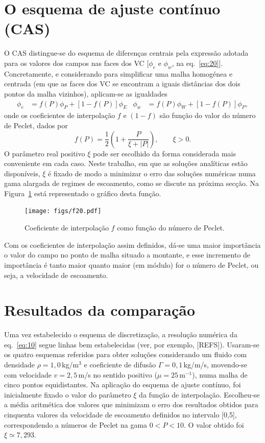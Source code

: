 \documentclass[11pt,twoside]{article}
\begin{document}
{\section{O esquema de ajuste contínuo (CAS)}
O CAS distingue-se do esquema de diferenças centrais pela expressão adotada para
os valores dos campos nas faces dos VC [$\phi_e$ e $\phi_w$, na
eq.~\eqref{eq:20}]. Concretamente, e considerando para simplificar uma malha
homogénea e centrada (em que as faces dos VC se encontram a iguais distâncias
dos dois pontos da malha vizinhos), aplicam-se as igualdades
\begin{align}
    \phi_e &= f(P)\phi_P + [1-f(P)]\phi_E&
    \phi_w &= f(P)\phi_W + [1-f(P)]\phi_P,
\end{align}
onde os coeficientes de interpolação $f$ e $(1-f)$ são função do valor do número
de Peclet, dados por
\begin{equation}
    f(P)=\frac12\left(1+\frac{P}{\xi+|P|}\right),\qquad\xi>0.
\end{equation}
O parâmetro real positivo $\xi$ pode ser escolhido da forma considerada mais
conveniente em cada caso. Neste trabalho, em que as soluções analíticas estão
disponíveis, $\xi$ é fixado de modo a minimizar o erro das soluções numéricas
numa gama alargada de regimes de escoamento, como se discute na próxima secção.
Na Figura~\ref{fig:20} está representado o gráfico desta função.
\begin{figure}[!h]
\centering
\texttt{[image: figs/f20.pdf]}
\caption{Coeficiente de interpolação $f$ como função do número de Peclet.
\label{fig:20}}
\end{figure}
Com os coeficientes de interpolação assim definidos, dá-se uma maior importância 
o valor do campo no ponto de malha situado a montante, e esse incremento de
importância é tanto maior quanto maior (em módulo) for o número de Peclet, ou
seja, a velocidade de escoamento.


\section{Resultados da comparação}
Uma vez estabelecido o esquema de discretização, a resolução numérica da
eq.~\eqref{eq:10} segue linhas bem estabelecidas (ver, por exemplo, [REFS]). Usaram-se os 
quatro esquemas referidos para obter soluções considerando um fluido com densidade $\rho=1,0$\,kg/m$^3$ e coeficiente de difusão $\Gamma=0,1$\,kg/m/s, movendo-se com velocidade $v=2,5$\,m/s no sentido positivo ($\mu=25$\,m$^{-1}$), numa malha de cinco pontos equidistantes. Na aplicação do esquema de ajuste contínuo, foi inicialmente fixado o valor do parâmetro $\xi$ da função de interpolação. Escolheu-se a média aritmética dos
valores que minimizam o erro dos resultados obtidos para cinquenta valores da
velocidade de escoamento definidos no intervalo [0,5], correspondendo a números
de Peclet na gama $0<P<10$. O valor obtido foi $\xi\simeq7,293$.

}
\end{document}
